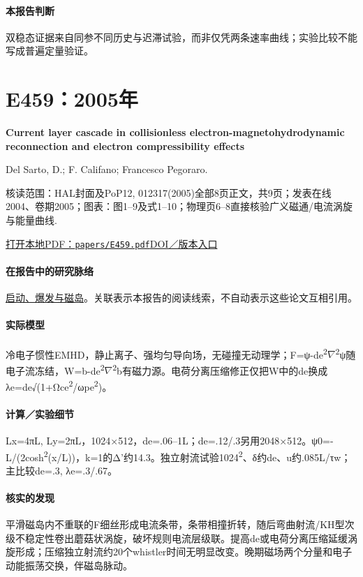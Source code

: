 \paragraph{本报告判断}双稳态证据来自同参不同历史与迟滞试验，而非仅凭两条速率曲线；实验比较不能写成普遍定量验证。

\section{E459：2005年}\label{paper:E459}

\textbf{Current layer cascade in collisionless electron-magnetohydrodynamic reconnection and electron compressibility effects}\citep{E459}\

Del Sarto,  D.;  F. Califano;  Francesco Pegoraro.

\textsf{核读范围：}HAL封面及PoP12, 012317(2005)全部8页正文，共9页；发表在线2004、卷期2005；\textsf{图表：}图1–9及式1–10；物理页6–8直接核验广义磁通/电流涡旋与能量曲线.

\href{run:papers/E459.pdf}{打开本地PDF：\texttt{papers/E459.pdf}}\quad\href{https://doi.org/10.1063/1.1829064}{DOI／版本入口}

\paragraph{在报告中的研究脉络}\hyperref[story:onset]{启动、爆发与磁岛}。关联表示本报告的阅读线索，不自动表示这些论文互相引用。

\paragraph{实际模型}冷电子惯性EMHD，静止离子、强均匀导向场，无碰撞无动理学；F=ψ-de\textsuperscript{2}\ensuremath{\nabla}\textsuperscript{2}ψ随电子流冻结，W=b-de\textsuperscript{2}\ensuremath{\nabla}\textsuperscript{2}b有磁力源。电荷分离压缩修正仅把W中的de换成λe=de√(1+Ωce\textsuperscript{2}/ωpe\textsuperscript{2})。

\paragraph{计算／实验细节}Lx=4πL, Ly=2πL，1024×512，de=.06–1L；de=.12/.3另用2048×512。ψ0=-L/(2cosh\textsuperscript{2}(x/L))，k=1的Δ'约14.3。独立射流试验1024\textsuperscript{2}、δ约de、u约.085L/τw；主比较de=.3, λe=.3/.67。

\paragraph{核实的发现}平滑磁岛内不重联的F细丝形成电流条带，条带相撞折转，随后弯曲射流/KH型次级不稳定性卷出蘑菇状涡旋，破坏规则电流层级联。提高de或电荷分离压缩延缓涡旋形成；压缩独立射流约20个whistler时间无明显改变。晚期磁场两个分量和电子动能振荡交换，伴磁岛脉动。

